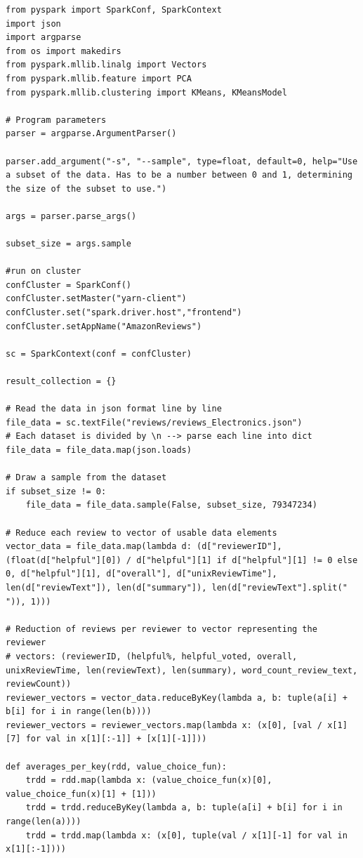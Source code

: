 \documentclass{scrartcl}
\theoremstyle{my_th_style}
\begin{document}
\begin{lstlisting}
from pyspark import SparkConf, SparkContext
import json
import argparse
from os import makedirs
from pyspark.mllib.linalg import Vectors
from pyspark.mllib.feature import PCA
from pyspark.mllib.clustering import KMeans, KMeansModel

# Program parameters
parser = argparse.ArgumentParser()

parser.add_argument("-s", "--sample", type=float, default=0, help="Use a subset of the data. Has to be a number between 0 and 1, determining the size of the subset to use.")

args = parser.parse_args()

subset_size = args.sample

#run on cluster
confCluster = SparkConf()
confCluster.setMaster("yarn-client")
confCluster.set("spark.driver.host","frontend")
confCluster.setAppName("AmazonReviews")

sc = SparkContext(conf = confCluster)

result_collection = {}

# Read the data in json format line by line
file_data = sc.textFile("reviews/reviews_Electronics.json")
# Each dataset is divided by \n --> parse each line into dict
file_data = file_data.map(json.loads)

# Draw a sample from the dataset
if subset_size != 0:
	file_data = file_data.sample(False, subset_size, 79347234)

# Reduce each review to vector of usable data elements
vector_data = file_data.map(lambda d: (d["reviewerID"], (float(d["helpful"][0]) / d["helpful"][1] if d["helpful"][1] != 0 else 0, d["helpful"][1], d["overall"], d["unixReviewTime"], len(d["reviewText"]), len(d["summary"]), len(d["reviewText"].split(" ")), 1)))

# Reduction of reviews per reviewer to vector representing the reviewer
# vectors: (reviewerID, (helpful%, helpful_voted, overall, unixReviewTime, len(reviewText), len(summary), word_count_review_text, reviewCount))
reviewer_vectors = vector_data.reduceByKey(lambda a, b: tuple(a[i] + b[i] for i in range(len(b))))
reviewer_vectors = reviewer_vectors.map(lambda x: (x[0], [val / x[1][7] for val in x[1][:-1]] + [x[1][-1]]))

def averages_per_key(rdd, value_choice_fun):
	trdd = rdd.map(lambda x: (value_choice_fun(x)[0], value_choice_fun(x)[1] + [1]))
	trdd = trdd.reduceByKey(lambda a, b: tuple(a[i] + b[i] for i in range(len(a))))
	trdd = trdd.map(lambda x: (x[0], tuple(val / x[1][-1] for val in x[1][:-1])))
	

\end{lstlisting}
\end{document}
